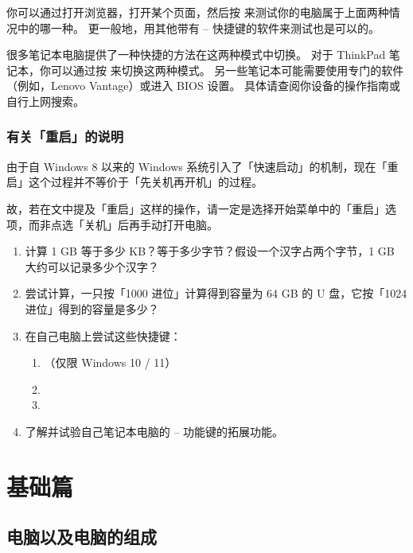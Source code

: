\documentclass[a4paper,x11names]{book}
\begin{document}
你可以通过打开浏览器，打开某个页面，然后按  来测试你的电脑属于上面两种情况中的哪一种。
更一般地，用其他带有  --  快捷键的软件来测试也是可以的。

很多笔记本电脑提供了一种快捷的方法在这两种模式中切换。
对于 ThinkPad 笔记本，你可以通过按  来切换这两种模式。
另一些笔记本可能需要使用专门的软件（例如，Lenovo Vantage）或进入 BIOS 设置。
具体请查阅你设备的操作指南或自行上网搜索。

\section{有关「重启」的说明}

由于自 Windows 8 以来的 Windows 系统引入了「快速启动」的机制，现在「重启」这个过程并不等价于「先关机再开机」的过程。

故，若在文中提及「重启」这样的操作，请一定是选择开始菜单中的「重启」选项，而非点选「关机」后再手动打开电脑。

\practice

\begin{enumerate}
  \item 计算 1 GB 等于多少 KB？等于多少字节？假设一个汉字占两个字节，1 GB 大约可以记录多少个汉字？
  \item 尝试计算，一只按「1000 进位」计算得到容量为 64 GB 的 U 盘，它按「1024 进位」得到的容量是多少？
  \item 在自己电脑上尝试这些快捷键：
    \begin{enumerate}
      \item {} （仅限 Windows 10 / 11）
      \item {}
      \item {}
    \end{enumerate}
  \item 了解并试验自己笔记本电脑的  --  功能键的拓展功能。
\end{enumerate}

\part{基础篇}

\chapter{电脑以及电脑的组成}
\end{document}
